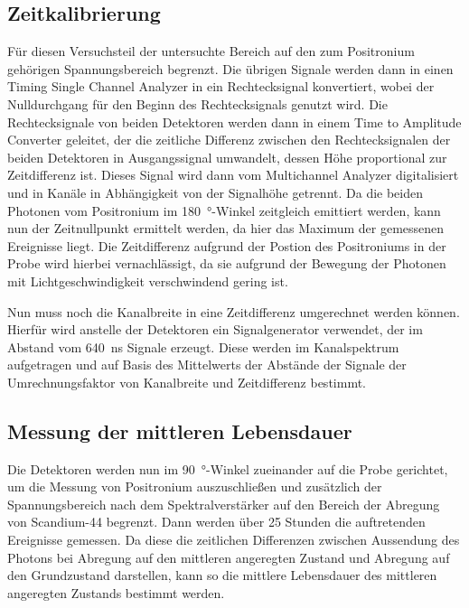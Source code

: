 \documentclass[
	a4paper,
	12pt,
	pagesize,
	ngerman
]{scrartcl}
\begin{document}
	\subsection{Zeitkalibrierung}
	Für diesen Versuchsteil der untersuchte Bereich auf den zum Positronium gehörigen Spannungsbereich begrenzt.
  Die übrigen Signale werden dann in einen Timing Single Channel Analyzer in ein Rechtecksignal konvertiert, wobei der Nulldurchgang für den Beginn des Rechtecksignals genutzt wird.
	Die Rechtecksignale von beiden Detektoren werden dann in einem Time to Amplitude Converter geleitet, der die zeitliche Differenz zwischen den Rechtecksignalen der beiden Detektoren in Ausgangssignal umwandelt, dessen Höhe proportional zur Zeitdifferenz ist.
	Dieses Signal wird dann vom Multichannel Analyzer digitalisiert und in Kanäle in Abhängigkeit von der Signalhöhe getrennt.
	Da die beiden Photonen vom Positronium im \SI{180}{\degree}-Winkel zeitgleich emittiert werden, kann nun der Zeitnullpunkt ermittelt werden, da hier das Maximum der gemessenen Ereignisse liegt.
	Die Zeitdifferenz aufgrund der Postion des Positroniums in der Probe wird hierbei vernachlässigt, da sie aufgrund der Bewegung der Photonen mit Lichtgeschwindigkeit verschwindend gering ist.

	Nun muss noch die Kanalbreite in eine Zeitdifferenz umgerechnet werden können.
	Hierfür wird anstelle der Detektoren ein Signalgenerator verwendet, der im Abstand vom \SI{640}{\nano \second} Signale erzeugt.
	Diese werden im Kanalspektrum aufgetragen und auf Basis des Mittelwerts der Abstände der Signale der Umrechnungsfaktor von Kanalbreite und Zeitdifferenz bestimmt.

	\subsection{Messung der mittleren Lebensdauer}

	Die Detektoren werden nun im \SI{90}{\degree}-Winkel zueinander auf die Probe gerichtet, um die Messung von Positronium auszuschließen und zusätzlich der Spannungsbereich nach dem Spektralverstärker auf den Bereich der Abregung von Scandium-44 begrenzt. %
	Dann werden über \num{25} Stunden die auftretenden Ereignisse gemessen.
	Da diese die zeitlichen Differenzen zwischen Aussendung des Photons bei Abregung auf den mittleren angeregten Zustand und Abregung auf den Grundzustand darstellen, kann so die mittlere Lebensdauer des mittleren angeregten Zustands bestimmt werden.
\end{document}
